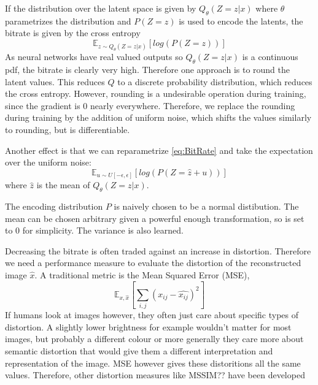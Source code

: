     If the distribution over the latent space is given by $Q_\theta(Z=z \vert x)$ where
    $\theta$ parametrizes the distribution and $P(Z=z)$ is used to encode the
    latents, the bitrate is given by the cross entropy
    \begin{equation}\label{eq:BitRate}
        \mathbb{E}_{z \sim Q_\theta(Z=z \vert x)}[log(P(Z=z))]
    \end{equation}
    As neural networks have real valued outputs so $Q_\theta(Z=z \vert x)$ is a
    continuous pdf, the bitrate is clearly very high. Therefore one approach is
    to round the latent values. This reduces $Q$ to a discrete probability
    distribution, which reduces the cross entropy. However, rounding is a
    undesirable operation during training, since the gradient is 0 nearly
    everywhere. Therefore, we replace the rounding during training by the
    addition of uniform noise, which shifts the values similarly to rounding,
    but is differentiable.
    
    Another effect is that we can reparametrize \ref{eq:BitRate} and take the
    expectation over the uniform noise:
    \begin{equation}
        \mathbb{E}_{u \sim U[-\epsilon, \epsilon]}[log(P(Z=\hat{z} + u))]
    \end{equation}
    where $\hat{z}$ is the mean of $Q_\theta(Z=z \vert x)$.


    

    The encoding distribution $P$ is naively chosen to be a normal distibution. The
    mean can be chosen arbitrary given a powerful enough transformation, so is
    set to 0 for simplicity. The variance is also learned.


    Decreasing the bitrate is often traded against an increase in distortion.
    Therefore we need a performance measure to evaluate the distortion of the
    reconstructed image $\hat{x}$. A traditional metric is the Mean Squared Error (MSE),
    \begin{equation}
        \mathbb{E}_{x, \hat{x}}[\sum_{i,j} (x_{ij} - \hat{x_{ij}})^2]
    \end{equation}
    If humans look at images however, they often just care about specific types
    of distortion. A slightly lower brightness for example wouldn't matter for
    most images, but probably a different colour or more generally they care
    more about semantic distortion that would give them a different
    interpretation and representation of the image. MSE however gives these
    distoritions all the same values. Therefore, other distortion measures like
    MSSIM?? have been developed


